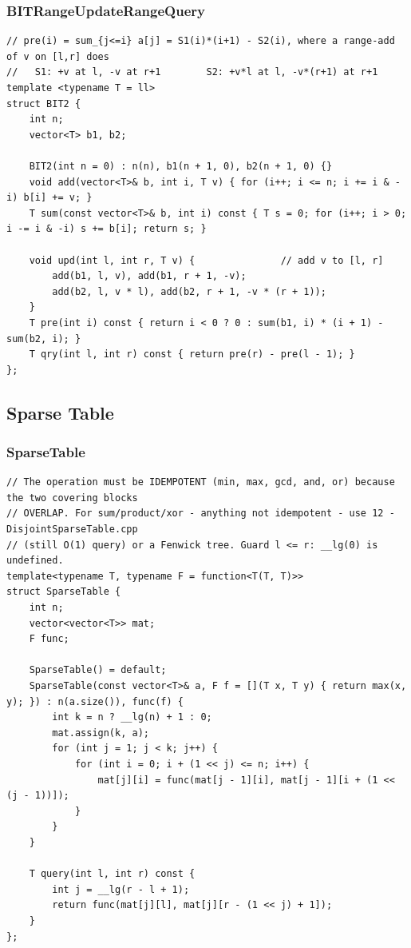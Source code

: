 \documentclass[9pt,a4paper,twocolumn]{extarticle}
\begin{document}
\subsubsection{BITRangeUpdateRangeQuery}
\nopagebreak
\begin{lstlisting}
// pre(i) = sum_{j<=i} a[j] = S1(i)*(i+1) - S2(i), where a range-add of v on [l,r] does
//   S1: +v at l, -v at r+1        S2: +v*l at l, -v*(r+1) at r+1
template <typename T = ll>
struct BIT2 {
    int n;
    vector<T> b1, b2;

    BIT2(int n = 0) : n(n), b1(n + 1, 0), b2(n + 1, 0) {}
    void add(vector<T>& b, int i, T v) { for (i++; i <= n; i += i & -i) b[i] += v; }
    T sum(const vector<T>& b, int i) const { T s = 0; for (i++; i > 0; i -= i & -i) s += b[i]; return s; }

    void upd(int l, int r, T v) {               // add v to [l, r]
        add(b1, l, v), add(b1, r + 1, -v);
        add(b2, l, v * l), add(b2, r + 1, -v * (r + 1));
    }
    T pre(int i) const { return i < 0 ? 0 : sum(b1, i) * (i + 1) - sum(b2, i); }
    T qry(int l, int r) const { return pre(r) - pre(l - 1); }
};
\end{lstlisting}

\subsection{Sparse Table}

\filbreak
\subsubsection{SparseTable}
\nopagebreak
\begin{lstlisting}
// The operation must be IDEMPOTENT (min, max, gcd, and, or) because the two covering blocks
// OVERLAP. For sum/product/xor - anything not idempotent - use 12 - DisjointSparseTable.cpp
// (still O(1) query) or a Fenwick tree. Guard l <= r: __lg(0) is undefined.
template<typename T, typename F = function<T(T, T)>>
struct SparseTable {
    int n;
    vector<vector<T>> mat;
    F func;

    SparseTable() = default;
    SparseTable(const vector<T>& a, F f = [](T x, T y) { return max(x, y); }) : n(a.size()), func(f) {
        int k = n ? __lg(n) + 1 : 0;
        mat.assign(k, a);
        for (int j = 1; j < k; j++) {
            for (int i = 0; i + (1 << j) <= n; i++) {
                mat[j][i] = func(mat[j - 1][i], mat[j - 1][i + (1 << (j - 1))]);
            }
        }
    }

    T query(int l, int r) const {
        int j = __lg(r - l + 1);
        return func(mat[j][l], mat[j][r - (1 << j) + 1]);
    }
};
\end{lstlisting}
\end{document}
